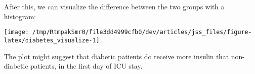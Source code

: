 \documentclass[
]{jss}
\begin{document}
After this, we can visualize the difference between the two groups with
a histogram:

\begin{CodeChunk}


\begin{center}\texttt{[image: /tmp/RtmpakSmr0/file3dd4999cfb0/dev/articles/jss\_files/figure-latex/diabetes\_visualize-1]} \end{center}

\end{CodeChunk}

The plot might suggest that diabetic patients do receive more insulin
that non-diabetic patients, in the first day of ICU stay.


\end{document}
